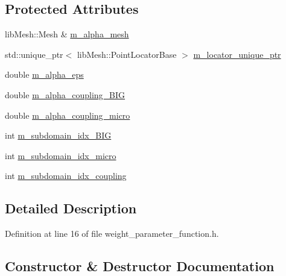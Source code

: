 \subsection*{Protected Attributes}
\begin{DoxyCompactItemize}
\item 
lib\+Mesh\+::\+Mesh \& \hyperlink{classcarl_1_1weight__parameter__function_aed4c30a6e4bf88b76666e7857fb252b7}{m\+\_\+alpha\+\_\+mesh}
\item 
std\+::unique\+\_\+ptr$<$ lib\+Mesh\+::\+Point\+Locator\+Base $>$ \hyperlink{classcarl_1_1weight__parameter__function_a8f4d7e9ab4bc2aecb33c7bf22582fbfc}{m\+\_\+locator\+\_\+unique\+\_\+ptr}
\item 
double \hyperlink{classcarl_1_1weight__parameter__function_aa5748118c244c8b2913f7ac656633957}{m\+\_\+alpha\+\_\+eps}
\item 
double \hyperlink{classcarl_1_1weight__parameter__function_a5addb5fcb856e919a1354362d1d48798}{m\+\_\+alpha\+\_\+coupling\+\_\+\+B\+I\+G}
\item 
double \hyperlink{classcarl_1_1weight__parameter__function_adc7991f0d1c0ba1eeb4b371fd0d09fb0}{m\+\_\+alpha\+\_\+coupling\+\_\+micro}
\item 
int \hyperlink{classcarl_1_1weight__parameter__function_a86a63e74305aaf0e2745f2269aaabc8a}{m\+\_\+subdomain\+\_\+idx\+\_\+\+B\+I\+G}
\item 
int \hyperlink{classcarl_1_1weight__parameter__function_a653e6a23b2ce926e7e38128667425bbf}{m\+\_\+subdomain\+\_\+idx\+\_\+micro}
\item 
int \hyperlink{classcarl_1_1weight__parameter__function_a64efe683ce8430a11e0361a5e2c4113a}{m\+\_\+subdomain\+\_\+idx\+\_\+coupling}
\end{DoxyCompactItemize}


\subsection{Detailed Description}


Definition at line 16 of file weight\+\_\+parameter\+\_\+function.\+h.



\subsection{Constructor \& Destructor Documentation}
\hypertarget{classcarl_1_1weight__parameter__function_abd2127d8abac16000224bf44029aea71}{}
